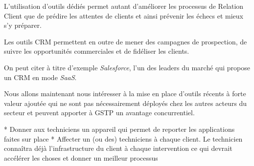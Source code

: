         L'utilisation d'outils dédiés permet autant d'améliorer les processus de Relation Client que de prédire les attentes de clients et ainsi prévenir les échecs et mieux s'y préparer.

        Les outils CRM permettent en outre de mener des campagnes de prospection, de suivre les opportunités commerciales et de fidéliser les clients.

        On peut citer à titre d'exemple \textit{Salesforce}, l'un des leaders du marché qui propose un CRM en mode \textit{SaaS}.




    Nous allons maintenant nous intéresser à la mise en place d'outils récents à forte valeur ajoutée qui ne sont pas nécessairement déployés chez les autres acteurs du secteur et peuvent apporter à GSTP un avantage concurrentiel.



* Donner aux techniciens un appareil qui permet de reporter les applications faites sur place
* Affecter un (ou des) techniciens à chaque client. Le technicien connaîtra déjà l'infrastructure du client à chaque intervention ce qui devrait accélérer les choses et donner un meilleur processus
